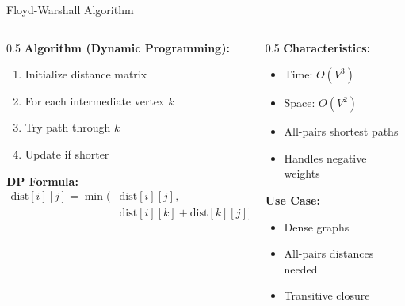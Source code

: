 \documentclass[aspectratio=169,xcolor=dvipsnames]{beamer}
\begin{document}
\begin{frame}{Floyd-Warshall Algorithm}
  \begin{columns}
    \begin{column}{0.5\textwidth}
      \textbf{Algorithm (Dynamic Programming):}
      \begin{enumerate}
        \item Initialize distance matrix
        \item For each intermediate vertex $k$
        \item Try path through $k$
        \item Update if shorter
      \end{enumerate}

      \vspace{0.3cm}
      \textbf{DP Formula:}
      \begin{align*}
        \text{dist}[i][j] = \min(&\text{dist}[i][j], \\
        &\text{dist}[i][k] + \text{dist}[k][j])
      \end{align*}
    \end{column}

    \begin{column}{0.5\textwidth}
      \textbf{Characteristics:}
      \begin{itemize}
        \item Time: $O(V^3)$
        \item Space: $O(V^2)$
        \item All-pairs shortest paths
        \item Handles negative weights
      \end{itemize}

      \vspace{0.3cm}
      \textbf{Use Case:}
      \begin{itemize}
        \item Dense graphs
        \item All-pairs distances needed
        \item Transitive closure
      \end{itemize}
    \end{column}
  \end{columns}
\end{frame}
\end{document}
